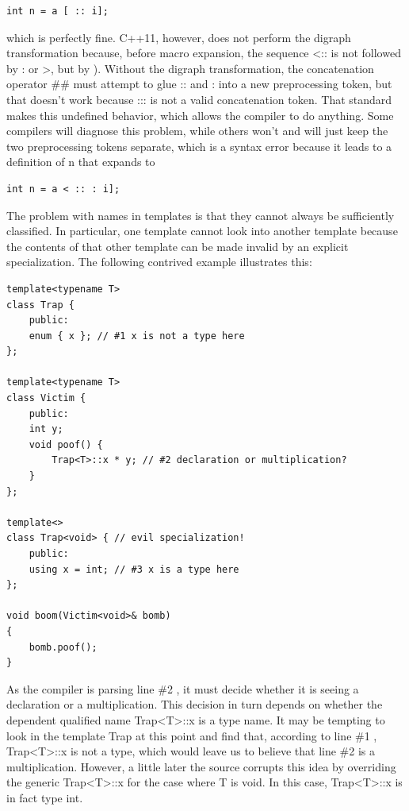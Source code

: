 \begin{lstlisting}[style=styleCXX]
int n = a [ :: i];
\end{lstlisting}

which is perfectly fine. C++11, however, does not perform the digraph transformation because, before macro expansion, the sequence <:: is not followed by : or >, but by ). Without the digraph transformation, the concatenation operator \#\# must attempt to glue :: and : into a new preprocessing token, but that doesn’t work because ::: is not a valid concatenation token. That standard makes this undefined behavior, which allows the compiler to do anything. Some compilers will diagnose this problem, while others won’t and will just keep the two preprocessing tokens separate, which is a syntax error because it leads to a definition of n that expands to

\begin{lstlisting}[style=styleCXX]
int n = a < :: : i];
\end{lstlisting}


The problem with names in templates is that they cannot always be sufficiently classified. In particular, one template cannot look into another template because the contents of that other template can be made invalid by an explicit specialization. The following contrived example illustrates this:

\begin{lstlisting}[style=styleCXX]
template<typename T>
class Trap {
	public:
	enum { x }; // #1 x is not a type here
};

template<typename T>
class Victim {
	public:
	int y;
	void poof() {
		Trap<T>::x * y; // #2 declaration or multiplication?
	}
};

template<>
class Trap<void> { // evil specialization!
	public:
	using x = int; // #3 x is a type here
};

void boom(Victim<void>& bomb)
{
	bomb.poof();
}
\end{lstlisting}

As the compiler is parsing line \#2 , it must decide whether it is seeing a declaration or a multiplication. This decision in turn depends on whether the dependent qualified name Trap<T>::x is a type name. It may be tempting to look in the template Trap at this point and find that, according to line \#1 , Trap<T>::x is not a type, which would leave us to believe that line \#2 is a multiplication. However, a little later the source corrupts this idea by overriding the generic Trap<T>::x for the case where T is void. In this case, Trap<T>::x is in fact type int.

